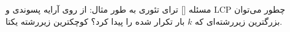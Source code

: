 ‌مسئله []
ترای تئوری
به طور مثال: از روی آرایه پسوندی و LCP چطور می‌توان بزرگترین زیررشته‌ای که $k$ بار تکرار شده را پیدا کرد؟
کوچکترین زیررشته یکتا.













